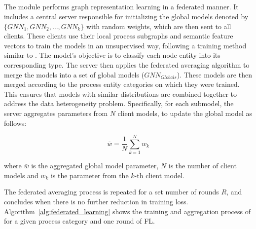 \subsection{\fpgl}
\label{sys:fpgl}


The module performs graph representation learning in a federated manner. It includes a central server responsible for initializing the global \gnnshort models denoted by \(\{GNN_1, GNN_2, \ldots, GNN_k\} \) with random weights, which are then sent to all clients. These clients use their local process subgraphs and semantic feature vectors to train the \gnnshort models in an unsupervised way, following a training method similar to \flash. The \gnnshort model's objective is to classify each node entity into its corresponding type. The server then applies the federated averaging algorithm to merge the \gnnshort models into a set of global models (\( GNN_{Globals} \)). These models are then merged according to the process entity categories on which they were trained. This ensures that models with similar distributions are combined together to address the data heterogeneity problem. Specifically, for each submodel, the server aggregates parameters from \(N\) client models, to update the global model as follows:

\begin{equation}
\bar{w} = \frac{1}{N} \sum_{k=1}^{N}w_k
\end{equation}

where \(\bar{w}\) is the aggregated global model parameter, \(N\) is the number of client models and \(w_k\) is the parameter from the \(k\)-th client model.

The federated averaging process is repeated for a set number of rounds \(R\), and concludes when there is no further reduction in training loss. Algorithm~\ref{alg:federated_learning} shows the training and aggregation process of \gnnshort for a given process category and one round of FL.

